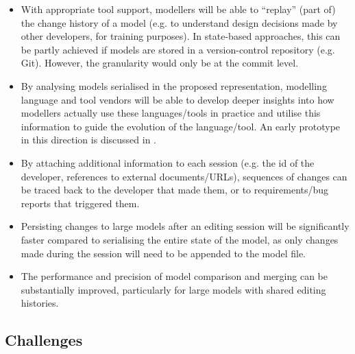 \begin{itemize}
  \item With appropriate tool support, modellers will be able to ``replay'' (part of) the change history of a model (e.g. to understand design decisions made by other developers, for training purposes). In state-based approaches, this can be partly achieved if models are stored in a version-control repository (e.g. Git). However, the granularity would only be at the commit level.
  \item By analysing models serialised in the proposed representation, modelling language and tool vendors will be able to develop deeper insights into how modellers actually use these languages/tools in practice and utilise this information to guide the evolution of the language/tool. An early prototype in this direction is discussed in \cite{polack2019towards}.
  \item By attaching additional information to each session (e.g. the id of the developer, references to external documents/URLs), sequences of changes can be traced back to the developer that made them, or to requirements/bug reports that triggered them.
  \item Persisting changes to large models after an editing session will be significantly faster compared to serialising the entire state of the model, as only changes made during the session will need to be appended to the model file.
  \item The performance and precision of model comparison and merging can be substantially improved, particularly for large models with shared editing histories.
\end{itemize}

\subsection{Challenges}
\label{sec:challenges}

